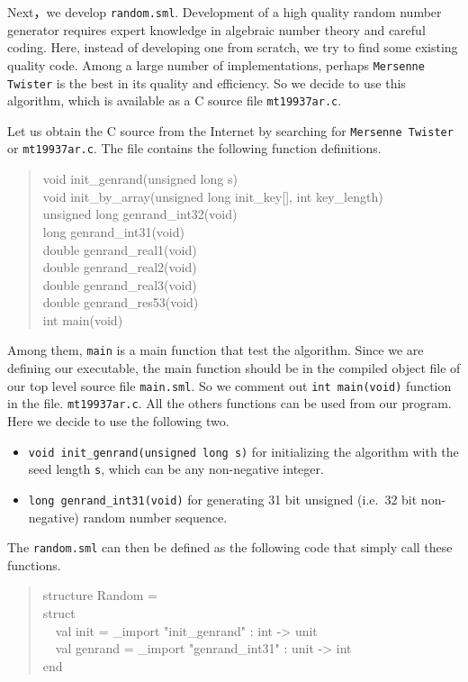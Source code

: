 \documentclass{jbook}
\newcommand{\myem}{\mbox{\ \ }}
\newenvironment{program}{\begin{quote}\begin{tt}}%
                        {\end{tt}\end{quote}}
\begin{document}
	Next，we develop {\tt random.sml}.
	Development of a high quality random number generator requires
expert knowledge in algebraic number theory and careful coding.
	Here, instead of developing one from scratch, we try to find
some existing quality code.
	Among a large number of implementations, perhaps {\tt Mersenne
Twister} is the best in its quality and efficiency.
	So we decide to use this algorithm, which is available as a C
source file {\tt mt19937ar.c}.
	
	Let us obtain the C source from the Internet by searching for
{\tt Mersenne Twister} or {\tt mt19937ar.c}.
	The file contains the following function definitions.
\begin{program}
void init\_genrand(unsigned long s)\\
void init\_by\_array(unsigned long init\_key[], int key\_length)\\
unsigned long genrand\_int32(void)\\
long genrand\_int31(void)\\
double genrand\_real1(void)\\
double genrand\_real2(void)\\
double genrand\_real3(void)\\
double genrand\_res53(void)\\
int main(void)
\end{program}
	Among them, {\tt main} is a main function that test the
algorithm.
	Since we are defining our executable, the main function should
be in the compiled object file of our top level source file {\tt main.sml}.
	So we comment out {\tt int main(void)} function in the
file. {\tt mt19937ar.c}.
	All the others functions can be used from our program.
	Here we decide to use the following two.
\begin{itemize}
\item {\tt void init\_genrand(unsigned long s)} for initializing the
algorithm with the seed length {\tt s}, which can be any non-negative
integer.
\item {\tt long genrand\_int31(void)} for generating 31 bit unsigned
(i.e.\ 32 bit non-negative) random number sequence.
\end{itemize}
	The {\tt random.sml} can then be defined as the following code
that simply call these functions.
\begin{program}
structure Random =\\
struct\\
\myem  val init = \_import "init\_genrand" : int -> unit\\
\myem  val genrand = \_import "genrand\_int31" : unit -> int\\
end
\end{program}
\end{document}

